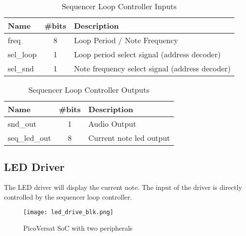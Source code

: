 \begin{table}[!htbp]
    \centering
    \caption{Sequencer Loop Controller Inputs}
    \label{tab:slcIn}
    \begin{tabular}{@{}lcl@{}}
    \toprule
    Name      & \multicolumn{1}{l}{\#bits} & Description                                    \\ \midrule
    freq & 8                          & Loop Period / Note Frequency                                    \\
    sel\_loop & 1                          & Loop period select signal (address decoder)    \\
    sel\_snd  & 1                          & Note frequency select signal (address decoder) \\ \bottomrule
    \end{tabular}
    \end{table}

\begin{table}[!htbp]
    \centering
    \caption{Sequencer Loop Controller Outputs}
    \label{tab:slcOut}
    \begin{tabular}{@{}lcl@{}}
    \toprule
    Name          & \multicolumn{1}{l}{\#bits} & Description             \\ \midrule
    snd\_out      & 1                          & Audio Output            \\
    seq\_led\_out & 8                          & Current note led output \\ \bottomrule
    \end{tabular}
    \end{table}

\subsection{LED Driver}

The LED driver will display the current note. The input of the driver is directly controlled by the sequencer loop controller.

\begin{figure}[!htbp]
    \centerline{\texttt{[image: led\_drive\_blk.png]}}
    \vspace{0cm}\caption{PicoVersat SoC with two peripherals}
    \label{fig:periphs}
\end{figure}

